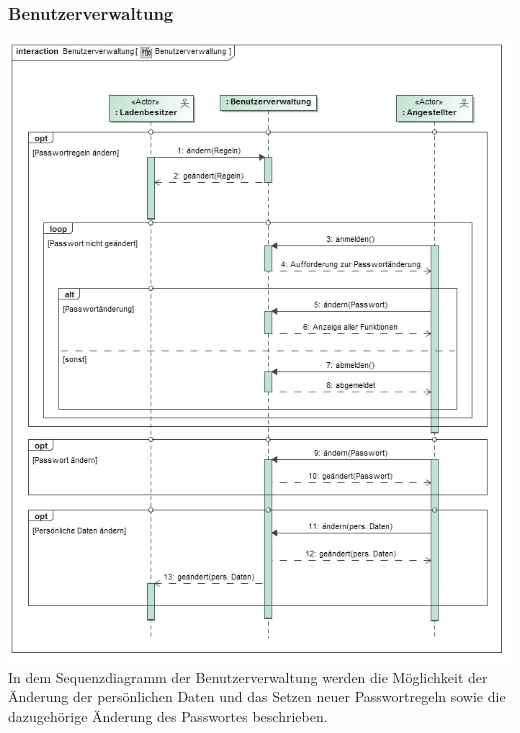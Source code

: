 \documentclass[pdftex,12pt,a4paper]{article}
\begin{document}
\subsubsection*{Benutzerverwaltung}
\includegraphics[width=1\textwidth]{../Pflichtenheft/images/benutzerverwaltung}
In dem Sequenzdiagramm der Benutzerverwaltung werden die M\"oglichkeit der \"Anderung der pers\"onlichen Daten und das Setzen neuer Passwortregeln sowie die dazugeh\"orige \"Anderung des Passwortes beschrieben.
\end{document}
